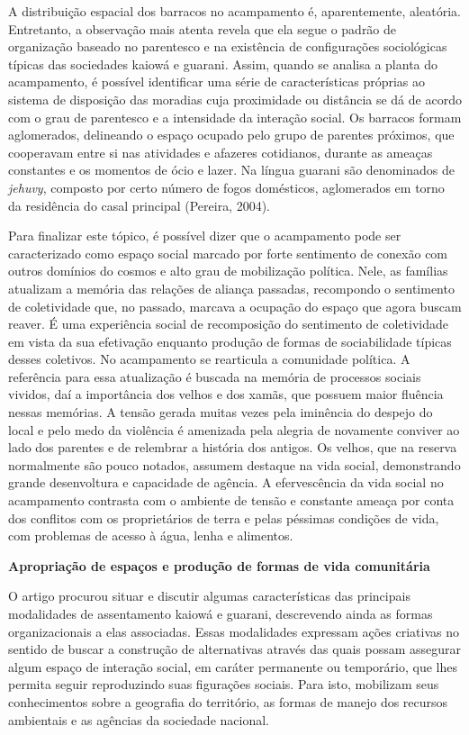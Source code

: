 A distribuição espacial dos barracos no acampamento é, aparentemente,
aleatória. Entretanto, a observação mais atenta revela que ela segue o
padrão de organização baseado no parentesco e na existência de
configurações sociológicas típicas das sociedades kaiowá e guarani.
Assim, quando se analisa a planta do acampamento, é possível identificar
uma série de características próprias ao sistema de disposição das
moradias cuja proximidade ou distância se dá de acordo com o grau de
parentesco e a intensidade da interação social. Os barracos formam
aglomerados, delineando o espaço ocupado pelo grupo de parentes
próximos, que cooperavam entre si nas atividades e afazeres cotidianos,
durante as ameaças constantes e os momentos de ócio e lazer. Na língua
guarani são denominados de \emph{jehuvy}, composto por certo número de
fogos domésticos, aglomerados em torno da residência do casal principal
(Pereira, 2004).

Para finalizar este tópico, é possível dizer que o acampamento pode ser
caracterizado como espaço social marcado por forte sentimento de conexão
com outros domínios do cosmos e alto grau de mobilização política. Nele,
as famílias atualizam a memória das relações de aliança passadas,
recompondo o sentimento de coletividade que, no passado, marcava a
ocupação do espaço que agora buscam reaver. É uma experiência social de
recomposição do sentimento de coletividade em vista da sua efetivação
enquanto produção de formas de sociabilidade típicas desses coletivos.
No acampamento se rearticula a comunidade política. A referência para
essa atualização é buscada na memória de processos sociais vividos, daí
a importância dos velhos e dos xamãs, que possuem maior fluência nessas
memórias. A tensão gerada muitas vezes pela iminência do despejo do
local e pelo medo da violência é amenizada pela alegria de novamente
conviver ao lado dos parentes e de relembrar a história dos antigos. Os
velhos, que na reserva normalmente são pouco notados, assumem destaque
na vida social, demonstrando grande desenvoltura e capacidade de
agência. A efervescência da vida social no acampamento contrasta com o
ambiente de tensão e constante ameaça por conta dos conflitos com os
proprietários de terra e pelas péssimas condições de vida, com problemas
de acesso à água, lenha e alimentos.

\textbf{Apropriação de espaços e produção de formas de vida comunitária}

O artigo procurou situar e discutir algumas características das
principais modalidades de assentamento kaiowá e guarani, descrevendo
ainda as formas organizacionais a elas associadas. Essas modalidades
expressam ações criativas no sentido de buscar a construção de
alternativas através das quais possam assegurar algum espaço de
interação social, em caráter permanente ou temporário, que lhes permita
seguir reproduzindo suas figurações sociais. Para isto, mobilizam seus
conhecimentos sobre a geografia do território, as formas de manejo dos
recursos ambientais e as agências da sociedade nacional.

